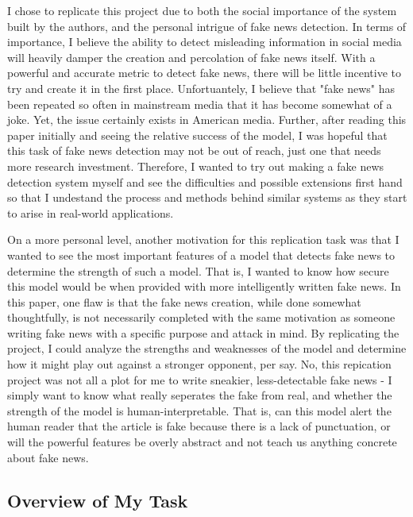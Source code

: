 \documentclass{article}
\begin{document}
I chose to replicate this project due to both the social importance of the system built by the authors, and the personal intrigue of fake news detection. In terms of importance, I believe the ability to detect misleading information in social media will heavily damper the creation and percolation of fake news itself. With a powerful and accurate metric to detect fake news, there will be little incentive to try and create it in the first place. Unfortuantely, I believe that "fake news" has been repeated so often in mainstream media that it has become somewhat of a joke. Yet, the issue certainly exists in American media. Further, after reading this paper initially and seeing the relative success of the model, I was hopeful that this task of fake news detection may not be out of reach, just one that needs more research investment. Therefore, I wanted to try out making a fake news detection system myself and see the difficulties and possible extensions first hand so that I undestand the process and methods behind similar systems as they start to arise in real-world applications.

On a more personal level, another motivation for this replication task was that I wanted to see the most important features of a model that detects fake news to determine the strength of such a model. That is, I wanted to know how secure this model would be when provided with more intelligently written fake news. In this paper, one flaw is that the fake news creation, while done somewhat thoughtfully, is not necessarily completed with the same motivation as someone writing fake news with a specific purpose and attack in mind. By replicating the project, I could analyze the strengths and weaknesses of the model and determine how it might play out against a stronger opponent, per say. No, this repication project was not all a plot for me to write sneakier, less-detectable fake news - I simply want to know what really seperates the fake from real, and whether the strength of the model is human-interpretable. That is, can this model alert the human reader that the article is fake because there is a lack of punctuation, or will the powerful features be overly abstract and not teach us anything concrete about fake news.

\subsection{Overview of My Task}
\end{document}
